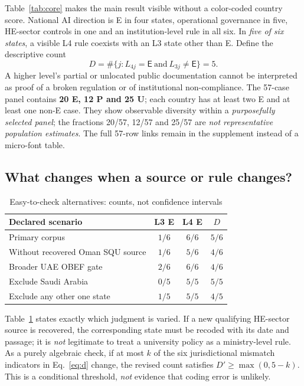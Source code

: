 \documentclass[conference,letterpaper]{IEEEtran}
\newcommand{\stE}{\textsf{E}}
\begin{document}
Table~\ref{tab:core} makes the main result visible without a color-coded country score. National AI direction is E in four states, operational governance in five, HE-sector controls in one and an institution-level rule in all six. In \emph{five of six states}, a visible L4 rule coexists with an L3 state other than E. Define the descriptive count
\begin{equation}\label{eq:d}
D=\#\{j:L_{4j}=\stE\ \text{and}\ L_{3j}\neq\stE\}=5.
\end{equation}
A higher level's partial or unlocated public documentation cannot be interpreted as proof of a broken regulation or of institutional non-compliance. The 57-case panel contains \textbf{20 E, 12 P and 25 U}; each country has at least two E and at least one non-E case. They show observable diversity within a \emph{purposefully selected panel}; the fractions 20/57, 12/57 and 25/57 are \emph{not representative population estimates}. The full 57-row links remain in the supplement instead of a micro-font table.

\subsection{What changes when a source or rule changes?}
\begin{table}[H]
\centering\caption{Easy-to-check alternatives: counts, not confidence intervals}
\label{tab:sensitivity}\small
\begin{tabularx}{\columnwidth}{@{}Xccc@{}}
\toprule
Declared scenario & L3 E & L4 E & $D$\tabularnewline\midrule
Primary corpus & $1/6$ & $6/6$ & $5/6$\tabularnewline
Without recovered Oman SQU source & $1/6$ & $5/6$ & $4/6$\tabularnewline
Broader UAE OBEF gate & $2/6$ & $6/6$ & $4/6$\tabularnewline
Exclude Saudi Arabia & $0/5$ & $5/5$ & $5/5$\tabularnewline
Exclude any other one state & $1/5$ & $5/5$ & $4/5$\tabularnewline\bottomrule
\end{tabularx}
\end{table}

Table~\ref{tab:sensitivity} states exactly which judgment is varied. If a new qualifying HE-sector source is recovered, the corresponding state must be recoded with its date and passage; it is \emph{not} legitimate to treat a university policy as a ministry-level rule. As a purely algebraic check, if at most $k$ of the six jurisdictional mismatch indicators in Eq.~\eqref{eq:d} change, the revised count satisfies $D'\ge\max(0,5-k)$. This is a conditional threshold, \emph{not} evidence that coding error is unlikely.
\end{document}
